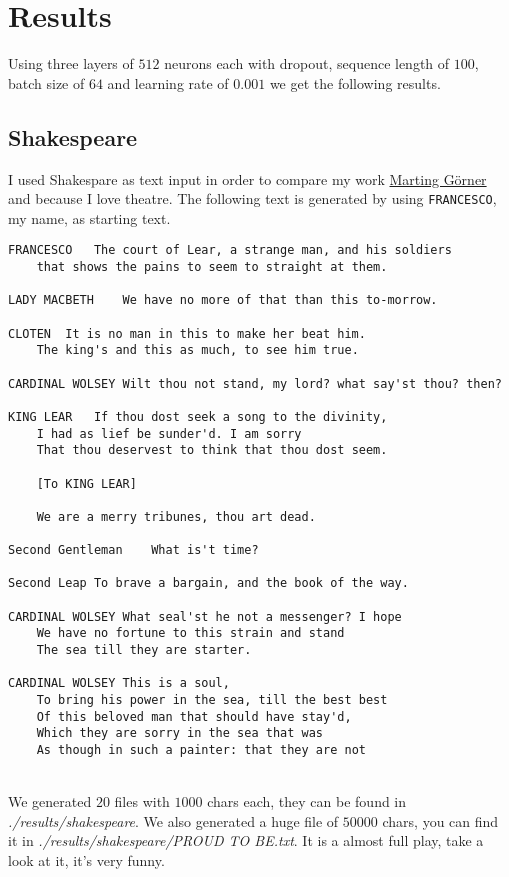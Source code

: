 \documentclass[11pt]{article}
\begin{document}
\section{Results}
Using three layers of $512$ neurons each with dropout, sequence length of $100$, batch size of $64$ and learning rate of $0.001$ we get the following results.
\subsection{Shakespeare}
I used Shakespare as text input in order to compare my work \href{https://www.youtube.com/watch?v=vq2nnJ4g6N0}{Marting Görner} and because I love theatre. The following text is generated by using \texttt{FRANCESCO}, my name, as starting text. \\
\begin{lstlisting}[breaklines=true]
FRANCESCO	The court of Lear, a strange man, and his soldiers
	that shows the pains to seem to straight at them.

LADY MACBETH	We have no more of that than this to-morrow.

CLOTEN	It is no man in this to make her beat him.
	The king's and this as much, to see him true.

CARDINAL WOLSEY	Wilt thou not stand, my lord? what say'st thou? then?

KING LEAR	If thou dost seek a song to the divinity,
	I had as lief be sunder'd. I am sorry
	That thou deservest to think that thou dost seem.

	[To KING LEAR]

	We are a merry tribunes, thou art dead.

Second Gentleman	What is't time?

Second Leap	To brave a bargain, and the book of the way.

CARDINAL WOLSEY	What seal'st he not a messenger? I hope
	We have no fortune to this strain and stand
	The sea till they are starter.

CARDINAL WOLSEY	This is a soul,
	To bring his power in the sea, till the best best
	Of this beloved man that should have stay'd,
	Which they are sorry in the sea that was
	As though in such a painter: that they are not
\end{lstlisting}\\
We generated $20$ files with $1000$ chars each, they can be found in \emph{./results/shakespeare}. We also generated a huge file of $50000$ chars, you can find it in \emph{./results/shakespeare/PROUD TO BE.txt}. It is a almost full play, take a look at it, it's very funny.
\end{document}
